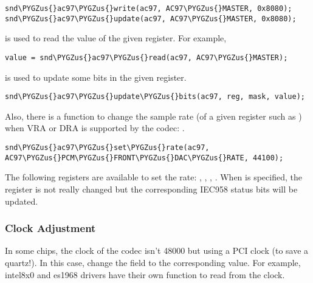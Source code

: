 \documentclass[a4paper,8pt,english]{sphinxmanual}
\def\PYGZus{\char`\_}
\begin{document}
\begin{Verbatim}[commandchars=\\\{\}]
snd\PYGZus{}ac97\PYGZus{}write(ac97, AC97\PYGZus{}MASTER, 0x8080);
snd\PYGZus{}ac97\PYGZus{}update(ac97, AC97\PYGZus{}MASTER, 0x8080);
\end{Verbatim}

{\hyperref[sound/kernel\string-api/alsa\string-driver\string-api:c.snd_ac97_read]{\emph{}}} is used to read the value of the given
register. For example,

\begin{Verbatim}[commandchars=\\\{\}]
value = snd\PYGZus{}ac97\PYGZus{}read(ac97, AC97\PYGZus{}MASTER);
\end{Verbatim}

{\hyperref[sound/kernel\string-api/alsa\string-driver\string-api:c.snd_ac97_update_bits]{\emph{}}} is used to update some bits in
the given register.

\begin{Verbatim}[commandchars=\\\{\}]
snd\PYGZus{}ac97\PYGZus{}update\PYGZus{}bits(ac97, reg, mask, value);
\end{Verbatim}

Also, there is a function to change the sample rate (of a given register
such as ) when VRA or DRA is supported by the
codec: {\hyperref[sound/kernel\string-api/alsa\string-driver\string-api:c.snd_ac97_set_rate]{\emph{}}}.

\begin{Verbatim}[commandchars=\\\{\}]
snd\PYGZus{}ac97\PYGZus{}set\PYGZus{}rate(ac97, AC97\PYGZus{}PCM\PYGZus{}FRONT\PYGZus{}DAC\PYGZus{}RATE, 44100);
\end{Verbatim}

The following registers are available to set the rate:
, ,
, . When  is
specified, the register is not really changed but the corresponding
IEC958 status bits will be updated.


\subsubsection{Clock Adjustment}
\label{sound/kernel-api/writing-an-alsa-driver:clock-adjustment}
In some chips, the clock of the codec isn't 48000 but using a PCI clock
(to save a quartz!). In this case, change the field  to
the corresponding value. For example, intel8x0 and es1968 drivers have
their own function to read from the clock.
\end{document}
